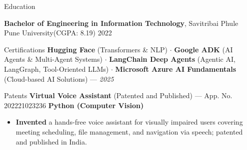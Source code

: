 \documentclass{resume} %
\begin{document}
\begin{rSection}{Education}

{\bf Bachelor of Engineering in Information Technology}, Savitribai Phule Pune University(CGPA: 8.19) \hfill {2022}

\end{rSection}


\begin{rSection}{Certifications}
\noindent\textbf{Hugging Face} (Transformers \& NLP) $\cdot$ \textbf{Google ADK} (AI Agents \& Multi-Agent Systems) $\cdot$ \textbf{LangChain Deep Agents} (Agentic AI, LangGraph, Tool-Oriented LLMs) $\cdot$ \textbf{Microsoft Azure AI Fundamentals} (Cloud-based AI Solutions) --- \textit{2025}
\end{rSection}


\begin{rSection}{Patents}
\textbf{Virtual Voice Assistant} (Patented and Published) --- App. No. 202221023236 \hfill \textbf{Python (Computer Vision)}
\begin{itemize}
    \item \textbf{Invented} a hands-free voice assistant for visually impaired users covering meeting scheduling, file management, and navigation via speech; patented and published in India.

\end{itemize}
\end{rSection}

\end{document}
